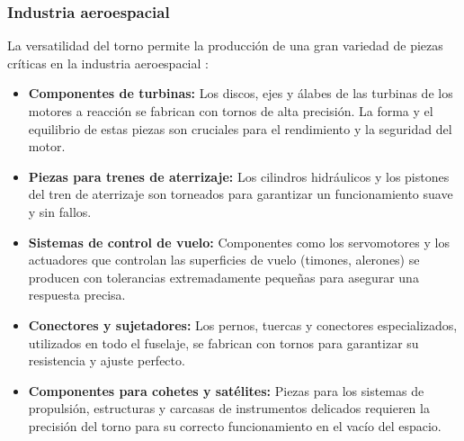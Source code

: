 \documentclass[12pt,a4paper]{article}
\begin{document}
\subsubsection{Industria aeroespacial}
La versatilidad del torno permite la producción de una gran variedad de piezas críticas en la industria aeroespacial \cite{cmz_ingenieria}:
\begin{itemize}[itemsep=2pt, topsep=2pt, parsep=0pt]
    \item \textbf{Componentes de turbinas:} Los discos, ejes y álabes de las turbinas de los motores a reacción se fabrican con tornos de alta precisión. La forma y el equilibrio de estas piezas son cruciales para el rendimiento y la seguridad del motor.
    \item \textbf{Piezas para trenes de aterrizaje:} Los cilindros hidráulicos y los pistones del tren de aterrizaje son torneados para garantizar un funcionamiento suave y sin fallos.
    \item \textbf{Sistemas de control de vuelo:} Componentes como los servomotores y los actuadores que controlan las superficies de vuelo (timones, alerones) se producen con tolerancias extremadamente pequeñas para asegurar una respuesta precisa.
    \item \textbf{Conectores y sujetadores:} Los pernos, tuercas y conectores especializados, utilizados en todo el fuselaje, se fabrican con tornos para garantizar su resistencia y ajuste perfecto.
    \item \textbf{Componentes para cohetes y satélites:} Piezas para los sistemas de propulsión, estructuras y carcasas de instrumentos delicados requieren la precisión del torno para su correcto funcionamiento en el vacío del espacio.
\end{itemize}
\end{document}
